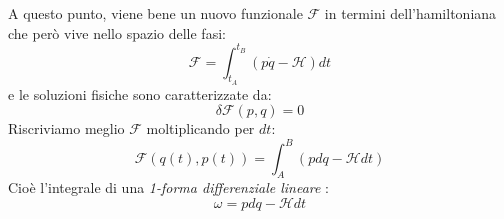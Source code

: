 \documentclass[a4paper,openany]{article}
\begin{document}
	A questo punto, viene bene un nuovo funzionale $\mathcal{F}$ in termini dell'hamiltoniana che però vive nello spazio delle fasi:
	$$
	\mathcal{F} = \int_{t_A}^{t_B}(p\dot{q}-\mathcal{H}) dt 
	$$
	e le soluzioni fisiche sono caratterizzate da:
	$$
	\delta \mathcal{F}(p,q) = 0
	$$
	Riscriviamo meglio $\mathcal{F}$ moltiplicando per $dt$:
	\begin{equation}\label{key}
		\mathcal{F}(q(t),p(t)) = \int_{A}^{B}(pdq-\mathcal{H}dt)
	\end{equation}
	Cioè l'integrale di una \textit{1-forma differenziale lineare} :
	$$
	\omega = pdq-\mathcal{H}dt
	$$
\end{document}
